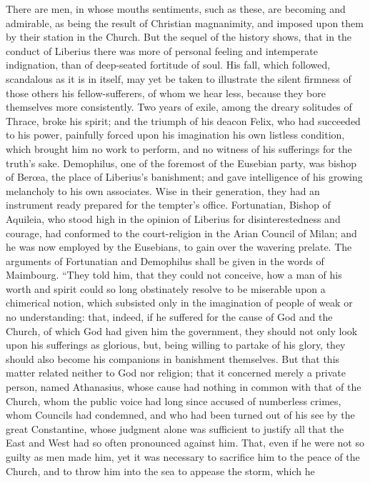 There are men, in whose mouths sentiments, such as these, are
becoming and admirable, as being the result of Christian magnanimity,
and imposed upon them by their station in the Church. But the sequel
of the history shows, that in the conduct of Liberius there was more
of personal feeling and intemperate indignation, than of deep-seated
fortitude of soul. His fall, which followed, scandalous as it is in
itself, may yet be taken to illustrate the silent firmness of those
others his fellow-sufferers, of whom we hear less, because they
bore themselves more consistently. Two years of exile, among the
dreary solitudes of Thrace, broke his spirit; and the triumph of his
deacon Felix, who had succeeded to his power, painfully forced upon
his imagination his own listless condition, which brought him no work
to perform, and no witness of his sufferings for the truth's sake.
Demophilus, one of the foremost of the Eusebian party, was bishop of
Berœa, the place of Liberius's banishment; and gave intelligence of
his growing melancholy to his own associates. Wise in their
generation, they had an instrument ready prepared for the tempter's
office. Fortunatian, Bishop of Aquileia, who stood high in the opinion
of Liberius for disinterestedness and courage, had conformed to the
court-religion in the Arian Council of Milan; and he was now employed
by the Eusebians, to gain over the wavering prelate. The arguments of
Fortunatian and Demophilus shall be given in the words of Maimbourg.
``They told him, that they could not conceive, how a man of his
worth and spirit could so long obstinately resolve to be miserable
upon a chimerical notion, which subsisted only in the imagination of
people of weak or no understanding: that, indeed, if he suffered for
the cause of God and the Church, of which God had given him the
government, they should not only look upon his sufferings as glorious,
but, being willing to partake of his glory, they should also become
his companions in banishment themselves. But that this matter related
neither to God nor religion; that it concerned merely a private
person, named Athanasius, whose cause had nothing in common with that
of the Church, whom the public voice had long since accused of
numberless crimes, whom Councils had condemned, and who had been
turned out of his see by the great Constantine, whose judgment alone
was sufficient to justify all that the East and West had so often
pronounced against him. That, even if he were not so guilty as men
made him, yet it was necessary to sacrifice him to the peace of the
Church, and to throw him into the sea to appease the storm, which he
